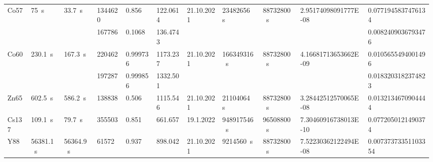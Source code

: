 \documentclass[12pt,a4paper]{article}
\begin{document}
\begin{spacing}{1.5}
\begin{landscape}
\begin{table}[]
\begin{tabular}{l|l|l|l|l|l|l|l|l|l|l}
\multirow{2}{*}{Co57} & \multirow{2}{*}{\SI{75}{\second}}      & \multirow{2}{*}{\SI{33.7}{\second}}    & \num{1344620}      & \num{0.856}     & \num{122.0614}     				  & \multirow{2}{*}{21.10.2021} & \multirow{2}{*}{\SI{23482656}{\second}}  & \multirow{2}{*}{\SI{88732800}{\second}} & \multirow{2}{*}{\num{2.95174098091777E-08}} & \num{0.0771945837476134}  \\  
                      &                         			   &                         				& \num{167786}       & \num{0.1068}    & \num{136.4743}     				  &                             &                            				&                           			  &                                       		& \num{0.0082409036793476}  \\ \hline
\multirow{2}{*}{Co60} & \multirow{2}{*}{\SI{230.1}{\second}}   & \multirow{2}{*}{\SI{167.3}{\second}}   & \num{220462}       & \num{0.999736}  & \num{1173.237}     				  & \multirow{2}{*}{21.10.2021} & \multirow{2}{*}{\SI{166349316}{\second}} & \multirow{2}{*}{\SI{88732800}{\second}} & \multirow{2}{*}{\num{4.16681713653662E-09}} & \num{0.0105655494001496}  \\  
                      &                          			   &                          				& \num{197287}       & \num{0.999856}  & \num{1332.501}    					  &                             &                            				&                           			  &                                       		& \num{0.0183203182374823}  \\ \hline
Zn65                  & \SI{602.5}{\second}                    & \SI{586.2}{\second}                    & \num{138838}       & \num{0.506}     & \num{1115.546}     				  & 21.10.2021                  & \SI{21104064}{\second}                   & \SI{88732800}{\second}                  & \num{3.28442512570065E-08}                  & \num{0.0132134670904444}  \\ \hline
Cs137                 & \SI{109.1}{\second}                    & \SI{79.7}{\second}                     & \num{355503}       & \num{0.851}     & \num{661.657}      				  & 19.1.2022                   & \SI{948917546}{\second}                  & \SI{96508800}{\second}                  & \num{7.30460916738013E-10}                  & \num{0.0772050121490374}  \\ \hline
\multirow{2}{*}{Y88}  & \multirow{2}{*}{\SI{56381.1}{\second}} & \multirow{2}{*}{\SI{56364.9}{\second}} & \num{61572}        & \num{0.937}     & \num{898.042}      				  & \multirow{2}{*}{21.10.2021} & \multirow{2}{*}{\SI{9214560}{\second}}   & \multirow{2}{*}{\SI{88732800}{\second}} & \multirow{2}{*}{\num{7.52230362122494E-08}} & \num{0.00737373351103354} \\ 

\end{tabular}
\end{table}
\end{landscape}
\end{spacing}
\end{document}
